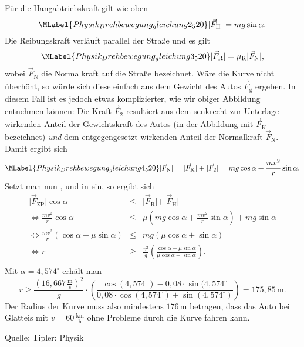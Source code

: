 \begin{MExercises}
\begin{MExercise}
\begin{MSolution}
  
   F\"ur die Hangabtriebskraft gilt wie oben
  \begin{equation}\MLabel{Physik_Drehbewegung_gleichung2_520}
  \vert\vec{F}_{\textrm{H}}\vert=mg\sin\alpha. 
  \end{equation}Die Reibungskraft verl\"auft parallel der Stra{\ss}e und es gilt
  \begin{equation}\MLabel{Physik_Drehbewegung_gleichung3_520}
  \vert\vec{F}_{\textrm{R}}\vert=\mu_{\textrm{R}} \vert\vec{F}_{\textrm{N}}\vert,
  \end{equation} wobei $\vec{F}_{\textrm{N}}$ die Normalkraft auf die Stra{\ss}e bezeichnet. W\"are die Kurve nicht \"uberh\"oht, so w\"urde sich diese einfach aus dem Gewicht des Autos $\vec{F}_{\textrm{g}}$ ergeben. In diesem Fall ist es jedoch etwas komplizierter, wie wir obiger Abbildung entnehmen k\"onnen: Die Kraft $\vec{F}_{\textrm{2}}$ resultiert aus dem senkrecht zur Unterlage wirkenden Anteil der Gewichtskraft des Autos (in der Abbildung mit $\vec{F}_{\textrm{K}}$ bezeichnet) \emph{und} dem entgegengesetzt wirkenden Anteil der Normalkraft $\vec{F}_{\textrm{N}}$. Damit ergibt sich
  \begin{equation}\MLabel{Physik_Drehbewegung_gleichung4_520}
  \vert\vec{F}_{\textrm{N}}\vert=\vert\vec{F}_{\textrm{K}}\vert+\vert\vec{F}_{\textrm{2}}\vert=mg\cos\alpha+\frac{mv^2}{r}\sin\alpha.
  \end{equation} Setzt man nun ,  und  in  ein, so ergibt sich
  \begin{eqnarray*}
  \vert\vec{F}_{\textrm{ZP}}\vert\cos\alpha&\le&\vert\vec{F}_{\textrm{R}}\vert+\vert\vec{F}_{\textrm{H}}\vert\\
  \Leftrightarrow \frac{mv^2}{r}\cos\alpha&\le& \mu\left(mg\cos\alpha+\frac{mv^2}{r}\sin\alpha\right)+mg\sin\alpha\\
  \Leftrightarrow \frac{mv^2}{r}\left(\cos\alpha-\mu\sin\alpha\right)&\le& mg\left(\mu\cos\alpha+\sin\alpha\right) \\
  \Leftrightarrow r&\ge& \frac{v^2}{g}\left(\frac{\cos\alpha-\mu\sin\alpha}{\mu\cos\alpha+\sin\alpha}\right).\\
  \end{eqnarray*} Mit $\alpha= 4{,}574^{\circ}$ erh\"alt man
  \begin{equation*}
  r\ge \frac{\left(16{,}667\,\frac{\text{m}}{\text{s}}\right)^2}{g}\cdot\left(\frac{\cos(4{,}574^{\circ})-0{,}08\cdot\sin(4{,}574^{\circ}}
  {0{,}08\cdot\cos(4{,}574^{\circ})+\sin(4{,}574^{\circ})}\right)
  =175,85\,\text{m}.
  \end{equation*} Der Radius der Kurve muss also mindestens $176\,\text{m}$ betragen, dass das Auto bei Glatteis mit $v=60\,\frac{\text{km}}{\text{h}}$ ohne Probleme durch die Kurve fahren kann.
  \end{MSolution}
  
  Quelle: Tipler: Physik
  \end{MExercise}
  
  \end{MExercises}
  
  \MPrintIndex
  
  
